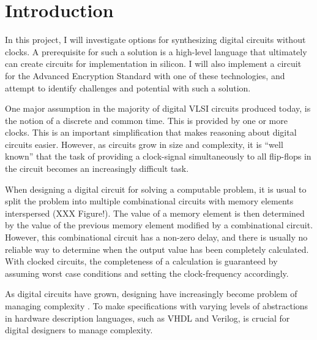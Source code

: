 \section{Introduction}

In this project, I will investigate options for synthesizing digital
circuits without clocks. A prerequisite for such a solution is a
high-level language that ultimately can create circuits for
implementation in silicon. I will also implement a circuit for the
 Advanced Encryption
Standard with one of these technologies, and attempt to identify
challenges and potential with such a solution.

One major assumption in the majority of digital
 VLSI circuits
produced today, is the notion of a discrete and common time. This is
provided by one or more clocks. This is an important simplification
that makes reasoning about digital circuits easier. However, as
circuits grow in size and complexity, it is ``well known''
\cite[pp. 5]{sparso} that the task of providing a clock-signal
simultaneously to all flip-flops in the circuit becomes an
increasingly difficult task.

When designing a digital circuit for solving a computable problem, it
is usual to split the problem into multiple combinational circuits
with memory elements interspersed (XXX Figure!). The value of a memory
element is then determined by the value of the previous memory element
modified by a combinational circuit. However, this combinational
circuit has a non-zero delay, and there is usually no reliable way to
determine when the output value has been completely calculated. With
clocked circuits, the completeness of a calculation is guaranteed by
assuming worst case conditions and setting the clock-frequency
accordingly.

As digital circuits have grown, designing have increasingly become
problem of managing complexity \cite{flynn2009deep}. To make
specifications with varying levels of abstractions in hardware
description languages, such as VHDL and Verilog, is crucial for
digital designers to manage complexity.

